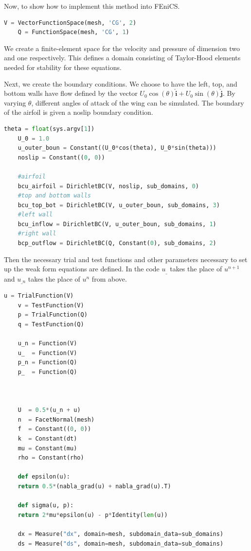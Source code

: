 \documentclass[12pt]{article}
\theoremstyle{definition}
\numberwithin{equation}{section}
\newcommand{\uvec}[1]{\boldsymbol{\hat{\textbf{#1}}}}
\begin{document}
	Now, to show how to implement this method into FEniCS. 
	\begin{lstlisting}[language=Python]
	V = VectorFunctionSpace(mesh, 'CG', 2)
	Q = FunctionSpace(mesh, 'CG', 1)
	\end{lstlisting}
	We create a finite-element space for the velocity and pressure of dimension two and one respectively. This defines a domain consisting of Taylor-Hood elements needed for stability for these equations. 
	
	Next, we create the boundary conditions. We choose to have the left, top, and bottom walls have flow defined by the vector $U_0\cos(\theta)\uvec{i} + U_0\sin(\theta)\uvec{j}$. By varying $\theta$, different angles of attack of the wing can be simulated. The boundary of the airfoil is given a noslip boundary condition. 
	
	\begin{lstlisting}[language=Python]
	theta = float(sys.argv[1])
	U_0 = 1.0
	u_outer_boun = Constant((U_0*cos(theta), U_0*sin(theta)))
	noslip = Constant((0, 0))
	
	#airfoil
	bcu_airfoil = DirichletBC(V, noslip, sub_domains, 0) 
	#top and bottom walls
	bcu_top_bot = DirichletBC(V, u_outer_boun, sub_domains, 3)
	#left wall
	bcu_inflow = DirichletBC(V, u_outer_boun, sub_domains, 1)
	#right wall 
	bcp_outflow = DirichletBC(Q, Constant(0), sub_domains, 2) 
	\end{lstlisting}
	
	Then the necessary trial and test functions and other parameters necessary to set up the weak form equations are defined. In the code $u_{\_}$ takes the place of $u^{n+1}$ and $u_{\_n}$ takes the place of $u^n$ from above. 
	
	\begin{lstlisting}[language=Python]
	u = TrialFunction(V)
	v = TestFunction(V)
	p = TrialFunction(Q)
	q = TestFunction(Q)
	
	u_n = Function(V)
	u_  = Function(V)
	p_n = Function(Q)
	p_  = Function(Q)
	
	
	
	U  = 0.5*(u_n + u)
	n  = FacetNormal(mesh)
	f  = Constant((0, 0))
	k  = Constant(dt)
	mu = Constant(mu)
	rho = Constant(rho)
	
	def epsilon(u):
	return 0.5*(nabla_grad(u) + nabla_grad(u).T)
	
	def sigma(u, p):
	return 2*mu*epsilon(u) - p*Identity(len(u))
	
	dx = Measure("dx", domain=mesh, subdomain_data=sub_domains)
	ds = Measure("ds", domain=mesh, subdomain_data=sub_domains)
	\end{lstlisting}
	
\end{document}
